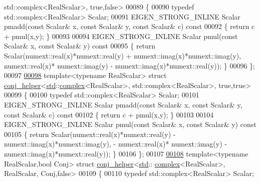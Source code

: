 \begin{DoxyCode}
      std::complex<RealScalar>, true,false>
00089 \{
00090   \textcolor{keyword}{typedef} std::complex<RealScalar> Scalar;
00091   EIGEN\_STRONG\_INLINE Scalar pmadd(\textcolor{keyword}{const} Scalar& x, \textcolor{keyword}{const} Scalar& y, \textcolor{keyword}{const} Scalar& c)\textcolor{keyword}{ const}
00092 \textcolor{keyword}{  }\{ \textcolor{keywordflow}{return} c + pmul(x,y); \}
00093 
00094   EIGEN\_STRONG\_INLINE Scalar pmul(\textcolor{keyword}{const} Scalar& x, \textcolor{keyword}{const} Scalar& y)\textcolor{keyword}{ const}
00095 \textcolor{keyword}{  }\{ \textcolor{keywordflow}{return} Scalar(numext::real(x)*numext::real(y) + numext::imag(x)*numext::imag(y), numext::real(x)*
      numext::imag(y) - numext::imag(x)*numext::real(y)); \}
00096 \};
00097 
\hyperlink{struct_eigen_1_1internal_1_1conj__helper_3_01std_1_1complex_3_01_real_scalar_01_4_00_01std_1_1co7e279017f32d052cf58f01f1590ee000}{00098} \textcolor{keyword}{template}<\textcolor{keyword}{typename} RealScalar> \textcolor{keyword}{struct }\hyperlink{struct_eigen_1_1internal_1_1conj__helper}{conj\_helper}<\hyperlink{namespacestd}{std}::\hyperlink{structcomplex}{complex}<RealScalar>, 
      std::complex<RealScalar>, true,true>
00099 \{
00100   \textcolor{keyword}{typedef} std::complex<RealScalar> Scalar;
00101   EIGEN\_STRONG\_INLINE Scalar pmadd(\textcolor{keyword}{const} Scalar& x, \textcolor{keyword}{const} Scalar& y, \textcolor{keyword}{const} Scalar& c)\textcolor{keyword}{ const}
00102 \textcolor{keyword}{  }\{ \textcolor{keywordflow}{return} c + pmul(x,y); \}
00103 
00104   EIGEN\_STRONG\_INLINE Scalar pmul(\textcolor{keyword}{const} Scalar& x, \textcolor{keyword}{const} Scalar& y)\textcolor{keyword}{ const}
00105 \textcolor{keyword}{  }\{ \textcolor{keywordflow}{return} Scalar(numext::real(x)*numext::real(y) - numext::imag(x)*numext::imag(y), - numext::real(x)*
      numext::imag(y) - numext::imag(x)*numext::real(y)); \}
00106 \};
00107 
\hyperlink{struct_eigen_1_1internal_1_1conj__helper_3_01std_1_1complex_3_01_real_scalar_01_4_00_01_real_scalar_00_01_conj_00_01false_01_4}{00108} \textcolor{keyword}{template}<\textcolor{keyword}{typename} RealScalar,\textcolor{keywordtype}{bool} Conj> \textcolor{keyword}{struct }\hyperlink{struct_eigen_1_1internal_1_1conj__helper}{conj\_helper}<\hyperlink{namespacestd}{std}::
      \hyperlink{structcomplex}{complex}<RealScalar>, RealScalar, Conj,false>
00109 \{
00110   \textcolor{keyword}{typedef} std::complex<RealScalar> Scalar;

\end{DoxyCode}
